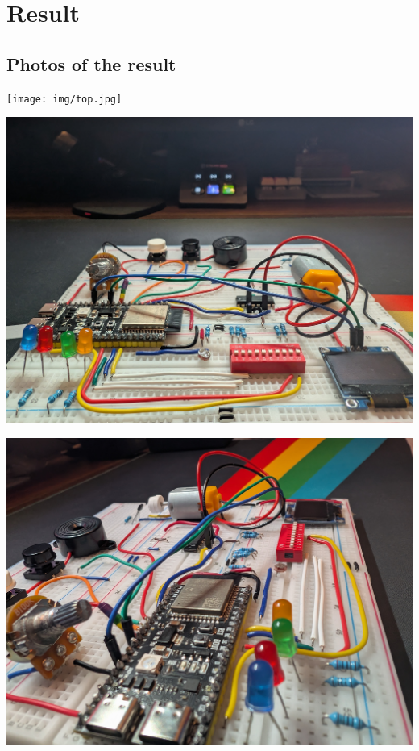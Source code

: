 \section{Result}
\graphicspath{ {./images/} }
\label{sec:result}

\subsection{Photos of the result}
\texttt{[image: img/top.jpg]}

\includegraphics[scale=0.05]{img/front.jpg}

\includegraphics[scale=0.05]{img/side.jpg}

